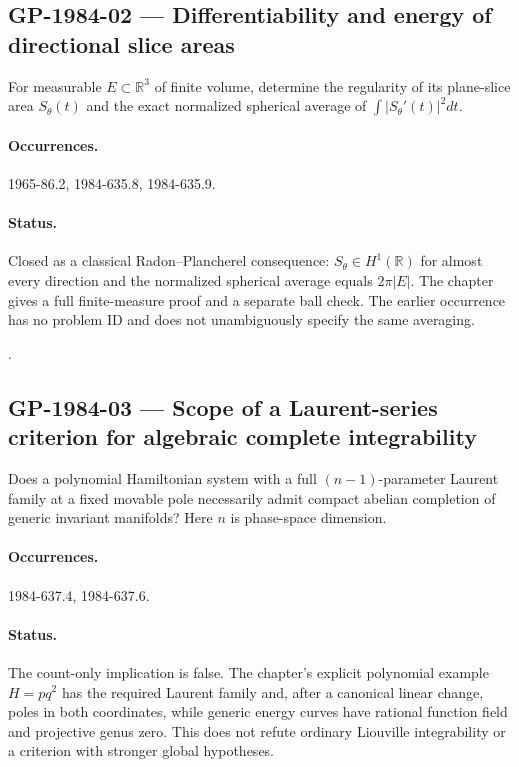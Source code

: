 \subsection{GP-1984-02 --- Differentiability and energy of directional slice areas}

\label{problem:GP-1984-02}

For measurable \(E\subset\mathbb R^3\) of finite volume, determine the regularity of its plane-slice area \(S_\theta(t)\) and the exact normalized spherical average of \(\int|S_\theta'(t)|^2dt\).

\paragraph{Occurrences.} 1965-86.2, 1984-635.8, 1984-635.9.

\paragraph{Status.} Closed as a classical Radon--Plancherel consequence: \(S_\theta\in H^1(\mathbb R)\) for almost every direction and the normalized spherical average equals \(2\pi|E|\). The chapter gives a full finite-measure proof and a separate ball check. The earlier occurrence has no problem ID and does not unambiguously specify the same averaging.

\noindent\citep{gelfandgraevvilenkin1966integral}.

\subsection{GP-1984-03 --- Scope of a Laurent-series criterion for algebraic complete integrability}

\label{problem:GP-1984-03}

Does a polynomial Hamiltonian system with a full \((n-1)\)-parameter Laurent family at a fixed movable pole necessarily admit compact abelian completion of generic invariant manifolds? Here \(n\) is phase-space dimension.

\paragraph{Occurrences.} 1984-637.4, 1984-637.6.

\paragraph{Status.} The count-only implication is false. The chapter's explicit polynomial example \(H=pq^2\) has the required Laurent family and, after a canonical linear change, poles in both coordinates, while generic energy curves have rational function field and projective genus zero. This does not refute ordinary Liouville integrability or a criterion with stronger global hypotheses.

